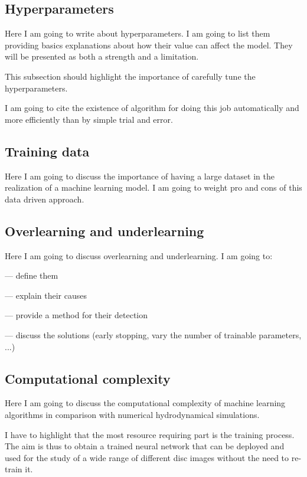 \documentclass[a4paper,10pt]{report}
\begin{document}
\subsection{Hyperparameters}

Here I am going to write about hyperparameters. I am going to list them
providing basics explanations about how their value can affect the model.
They will be presented as both a strength and a limitation.

This subsection should highlight the importance of carefully tune the hyperparameters.

I am going to cite the existence of algorithm for doing this job automatically and more
efficiently than by simple trial and error.

\subsection{Training data}

Here I am going to discuss the importance of having a large dataset in the realization
of a machine learning model. I am going to weight pro and cons of this data driven 
approach.

\subsection{Overlearning and underlearning}

Here I am going to discuss overlearning and underlearning. 
I am going to:

    — define them

    — explain their causes

    — provide a method for their  detection 

    — discuss the solutions (early stopping, vary the number of trainable parameters, ...)

\subsection{Computational complexity}
Here I am going to discuss the computational complexity of machine learning
 algorithms in comparison with numerical hydrodynamical simulations.

I have to highlight that the most resource requiring part is the training process.
The aim is thus to obtain a trained neural network that can be deployed and used for the study of
a wide range of different disc images without the need to re-train it.
\end{document}
